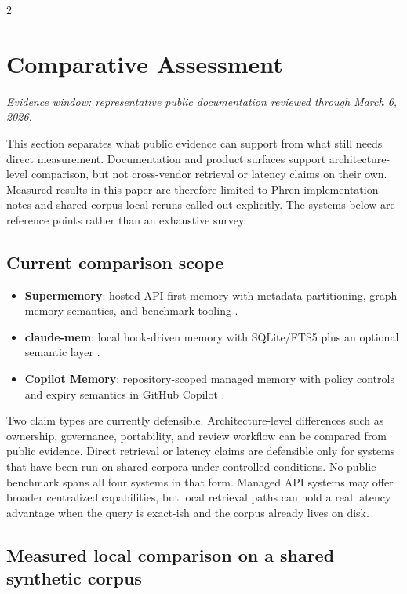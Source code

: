 \documentclass[10pt]{article}
\begin{document}
\begin{multicols}{2}
\pagebreak[2]
\section{Comparative Assessment}
\textit{Evidence window: representative public documentation reviewed through March 6, 2026.}

This section separates what public evidence can support from what still needs direct measurement. Documentation and product surfaces support architecture-level comparison, but not cross-vendor retrieval or latency claims on their own. Measured results in this paper are therefore limited to Phren implementation notes and shared-corpus local reruns called out explicitly. The systems below are reference points rather than an exhaustive survey.

\subsection{Current comparison scope}
\raggedright
\begin{itemize}
  \item \textbf{Supermemory}: hosted API-first memory with metadata partitioning, graph-memory semantics, and benchmark tooling \cite{sm-intro,sm-create,sm-filter,sm-graph,sm-bench}.
  \item \textbf{claude-mem}: local hook-driven memory with SQLite/FTS5 plus an optional semantic layer \cite{cm-overview,cm-hooks,cm-db,cm-search}.
  \item \textbf{Copilot Memory}: repository-scoped managed memory with policy controls and expiry semantics in GitHub Copilot \cite{gh-memory-docs,gh-changelog-jan2026,gh-changelog-mar2026}.
\end{itemize}

Two claim types are currently defensible. Architecture-level differences such as ownership, governance, portability, and review workflow can be compared from public evidence. Direct retrieval or latency claims are defensible only for systems that have been run on shared corpora under controlled conditions. No public benchmark spans all four systems in that form. Managed API systems may offer broader centralized capabilities, but local retrieval paths can hold a real latency advantage when the query is exact-ish and the corpus already lives on disk.

\subsection{Measured local comparison on a shared synthetic corpus}


\end{multicols}
\end{document}
